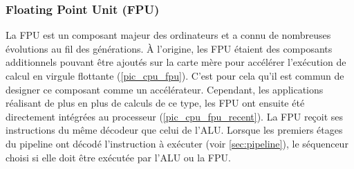     
    \subsubsection{Floating Point Unit (FPU)}
        La \gls{FPU} est un composant majeur des ordinateurs et a connu de nombreuses évolutions au fil des générations. À l'origine, les FPU étaient des composants additionnels pouvant être ajoutés sur la carte mère pour accélérer l'exécution de calcul en virgule flottante (\autoref{pic_cpu_fpu}). C'est pour cela qu'il est commun de designer ce composant comme un accélérateur. Cependant, les applications réalisant de plus en plus de calculs de ce type, les FPU ont ensuite été directement intégrées au processeur (\autoref{pic_cpu_fpu_recent}). La FPU reçoit ses instructions du même décodeur que celui de l'\gls{ALU}. Lorsque les premiers étages du pipeline ont décodé l'instruction à exécuter (voir \autoref{sec:pipeline}), le séquenceur choisi si elle doit être exécutée par l'\gls{ALU} ou la \gls{FPU}. 
        
